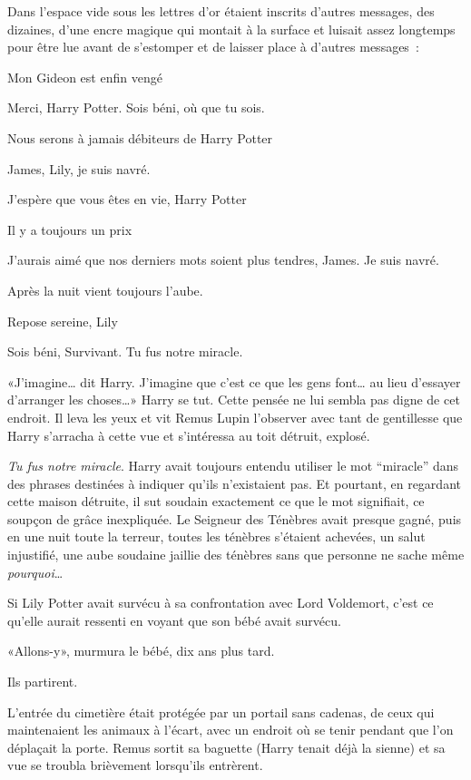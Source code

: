 Dans l'espace vide sous les lettres d'or étaient inscrits d'autres messages, des dizaines, d'une encre magique qui montait à la surface et luisait assez longtemps pour être lue avant de s'estomper et de laisser place à d'autres messages~:
\begin{center}

Mon Gideon est enfin vengé

Merci, Harry Potter. Sois béni, où que tu sois.

Nous serons à jamais débiteurs de Harry Potter

James, Lily, je suis navré.

J'espère que vous êtes en vie, Harry Potter

Il y a toujours un prix

J'aurais aimé que nos derniers mots soient plus tendres, James. Je suis navré.

Après la nuit vient toujours l'aube.

Repose sereine, Lily

Sois béni, Survivant. Tu fus notre miracle.
\end{center}

«J'imagine… dit Harry. J'imagine que c'est ce que les gens font… au lieu d'essayer d'arranger les choses…» Harry se tut. Cette pensée ne lui sembla pas digne de cet endroit. Il leva les yeux et vit Remus Lupin l'observer avec tant de gentillesse que Harry s'arracha à cette vue et s'intéressa au toit détruit, explosé.

\emph{Tu fus notre miracle}. Harry avait toujours entendu utiliser le mot “miracle” dans des phrases destinées à indiquer qu'ils n'existaient pas. Et pourtant, en regardant cette maison détruite, il sut soudain exactement ce que le mot signifiait, ce soupçon de grâce inexpliquée. Le Seigneur des Ténèbres avait presque gagné, puis en une nuit toute la terreur, toutes les ténèbres s'étaient achevées, un salut injustifié, une aube soudaine jaillie des ténèbres sans que personne ne sache même \emph{pourquoi}…

Si Lily Potter avait survécu à sa confrontation avec Lord Voldemort, c'est ce qu'elle aurait ressenti en voyant que son bébé avait survécu.

«Allons-y», murmura le bébé, dix ans plus tard.

Ils partirent.

L'entrée du cimetière était protégée par un portail sans cadenas, de ceux qui maintenaient les animaux à l'écart, avec un endroit où se tenir pendant que l'on déplaçait la porte. Remus sortit sa baguette (Harry tenait déjà la sienne) et sa vue se troubla brièvement lorsqu'ils entrèrent.

